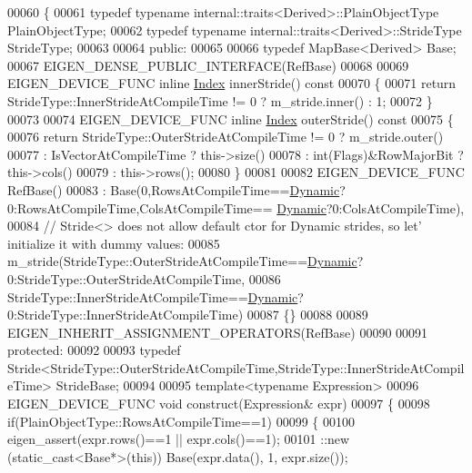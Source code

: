 \begin{DoxyCode}
00060 \{
00061   \textcolor{keyword}{typedef} \textcolor{keyword}{typename} internal::traits<Derived>::PlainObjectType PlainObjectType;
00062   \textcolor{keyword}{typedef} \textcolor{keyword}{typename} internal::traits<Derived>::StrideType StrideType;
00063 
00064 \textcolor{keyword}{public}:
00065 
00066   \textcolor{keyword}{typedef} MapBase<Derived> Base;
00067   EIGEN\_DENSE\_PUBLIC\_INTERFACE(RefBase)
00068 
00069   EIGEN\_DEVICE\_FUNC \textcolor{keyword}{inline} \hyperlink{namespace_eigen_a62e77e0933482dafde8fe197d9a2cfde}{Index} innerStride()\textcolor{keyword}{ const}
00070 \textcolor{keyword}{  }\{
00071     \textcolor{keywordflow}{return} StrideType::InnerStrideAtCompileTime != 0 ? m\_stride.inner() : 1;
00072   \}
00073 
00074   EIGEN\_DEVICE\_FUNC \textcolor{keyword}{inline} \hyperlink{namespace_eigen_a62e77e0933482dafde8fe197d9a2cfde}{Index} outerStride()\textcolor{keyword}{ const}
00075 \textcolor{keyword}{  }\{
00076     \textcolor{keywordflow}{return} StrideType::OuterStrideAtCompileTime != 0 ? m\_stride.outer()
00077          : IsVectorAtCompileTime ? this->size()
00078          : int(Flags)&RowMajorBit ? this->cols()
00079          : this->rows();
00080   \}
00081 
00082   EIGEN\_DEVICE\_FUNC RefBase()
00083     : Base(0,RowsAtCompileTime==\hyperlink{namespace_eigen_ad81fa7195215a0ce30017dfac309f0b2}{Dynamic}?0:RowsAtCompileTime,ColsAtCompileTime==
      \hyperlink{namespace_eigen_ad81fa7195215a0ce30017dfac309f0b2}{Dynamic}?0:ColsAtCompileTime),
00084       \textcolor{comment}{// Stride<> does not allow default ctor for Dynamic strides, so let' initialize it with dummy values:}
00085       m\_stride(StrideType::OuterStrideAtCompileTime==\hyperlink{namespace_eigen_ad81fa7195215a0ce30017dfac309f0b2}{Dynamic}?0:StrideType::OuterStrideAtCompileTime,
00086                StrideType::InnerStrideAtCompileTime==\hyperlink{namespace_eigen_ad81fa7195215a0ce30017dfac309f0b2}{Dynamic}?0:StrideType::InnerStrideAtCompileTime)
00087   \{\}
00088   
00089   EIGEN\_INHERIT\_ASSIGNMENT\_OPERATORS(RefBase)
00090 
00091 \textcolor{keyword}{protected}:
00092 
00093   \textcolor{keyword}{typedef} Stride<StrideType::OuterStrideAtCompileTime,StrideType::InnerStrideAtCompileTime> StrideBase;
00094 
00095   \textcolor{keyword}{template}<\textcolor{keyword}{typename} Expression>
00096   EIGEN\_DEVICE\_FUNC \textcolor{keywordtype}{void} construct(Expression& expr)
00097   \{
00098     \textcolor{keywordflow}{if}(PlainObjectType::RowsAtCompileTime==1)
00099     \{
00100       eigen\_assert(expr.rows()==1 || expr.cols()==1);
00101       ::new (static\_cast<Base*>(\textcolor{keyword}{this})) Base(expr.data(), 1, expr.size());

\end{DoxyCode}
